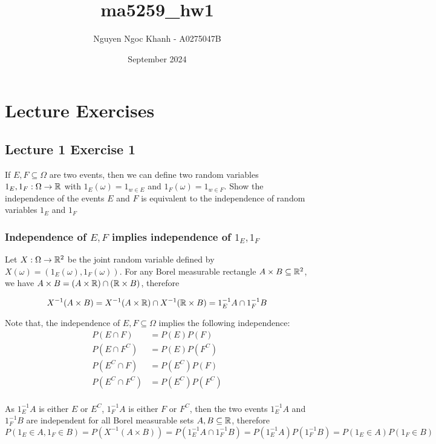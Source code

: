\documentclass{article}
\title{ma5259\_hw1}
\author{Nguyen Ngoc Khanh - A0275047B}
\date{September 2024}
\begin{document}
\maketitle

\section{Lecture Exercises}

\subsection{Lecture 1 Exercise 1}

If $E, F \subseteq \Omega$ are two events, then we can define two random variables $1_E, 1_F: \Omega \to \mathbb{R}$ with $1_E(\omega) = 1_{w \in E}$ and $1_F(\omega) = 1_{w \in F}$. Show the independence of the events $E$ and $F$ is equivalent to the independence of random variables $1_E$ and $1_F$

\subsubsection{Independence of $E, F$ implies independence of $1_E, 1_F$}

Let $X: \Omega \to \mathbb{R}^2$ be the joint random variable defined by $X(\omega) = (1_E(\omega), 1_F(\omega))$. For any Borel measurable rectangle $A \times B \subseteq \mathbb{R}^2$, we have $A \times B = (A \times \mathbb{R}) \cap (\mathbb{R} \times B)$, therefore

$$
    X^{-1} (A \times B)
    = X^{-1}(A \times \mathbb{R}) \cap X^{-1}(\mathbb{R} \times B)
    = 1_E^{-1} A \cap 1_F^{-1} B
$$

Note that, the independence of $E, F \subseteq \Omega$ implies the following independence:
\begin{align*}
    P(E \cap F) &= P(E) P(F) \\
    P(E \cap F^C) &= P(E) P(F^C) \\
    P(E^C \cap F) &= P(E^C) P(F) \\
    P(E^C \cap F^C) &= P(E^C) P(F^C) \\
\end{align*}

As $1_E^{-1} A$ is either $E$ or $E^C$, $1_F^{-1} A$ is either $F$ or $F^C$, then the two events $1_E^{-1} A$ and $1_F^{-1} B$ are independent for all Borel measurable sets $A, B \subseteq \mathbb{R}$, therefore
$$
    P(1_E \in A, 1_F \in B)
    = P(X^{-1}(A \times B))
    = P(1_E^{-1} A \cap 1_F^{-1} B)
    = P(1_E^{-1} A) P(1_F^{-1} B)
    = P(1_E \in A) P(1_F \in B)
$$
\end{document}
